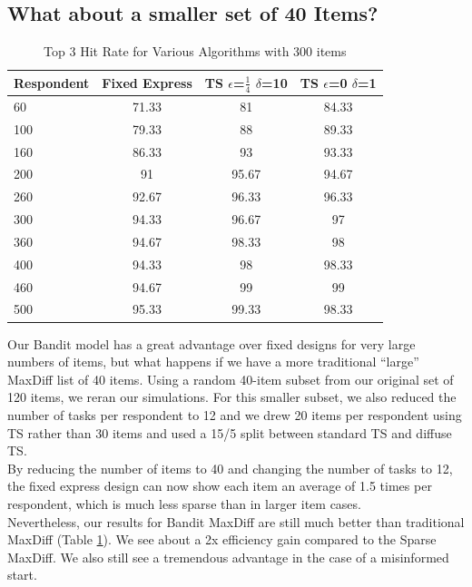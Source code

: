 \documentclass[nonblindrev]{informs3}
\begin{document}
\subsection{What about a smaller set of 40 Items?}
\begin{table}
\begin{center}
\begin{tabular}{l | c | c | c}
 Respondent& Fixed Express &  TS $\epsilon$=$\frac{1}{4}$ $\delta$=10  &TS $\epsilon$=0 $\delta$=1 \\
\hline
60	&	71.33	&	81	&	84.33	\\
100	&	79.33	&	88	&	89.33\\
160	&	86.33	&	93	&	93.33	\\
200	&	91	&	95.67	&	94.67	\\
260	&	92.67	&	96.33	&	96.33	\\
300	&	94.33	&	96.67	&	97	\\
360	&	94.67	&	98.33	&	98	\\
400	&	94.33	&	98	&	98.33	\\
460	&	94.67	&	99	&	99	\\
500	&	95.33	&	99.33	&	98.33	\\
\hline
\end{tabular}
\end{center}
\caption{Top 3 Hit Rate for Various Algorithms with 300 items}
\label{table:40top3}
\end{table}
Our Bandit model has a great advantage over fixed designs for very large numbers of items, but what happens if we have a more traditional ``large'' MaxDiff list of 40 items. Using a random 40-item subset from our original set of 120 items, we reran our simulations. For this smaller subset, we also reduced the number of tasks per respondent to 12 and we drew 20 items per respondent using TS rather than 30 items and used a 15/5 split between standard TS and diffuse TS.\\
By reducing the number of items to 40 and changing the number of tasks to 12, the fixed express design can now show each item an average of 1.5 times per respondent, which is much less sparse than in larger item cases.\\
Nevertheless, our results for Bandit MaxDiff are still much better than traditional MaxDiff (Table \ref{table:40top3}). We see about a 2x efficiency gain compared to the Sparse MaxDiff. We also still see a tremendous advantage in the case of a misinformed start.\\
\end{document}
